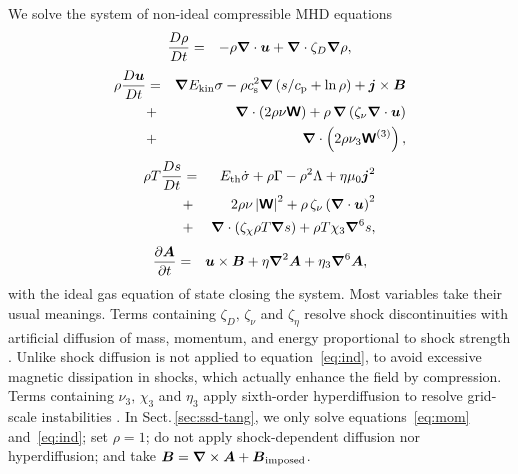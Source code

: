 \documentclass[preprint2]{aastex63}
\newcommand\ESK{E_{\rm kin}}
\newcommand\EST{E_{\rm th}}
\newcommand{\vect}[1]{{{\mbox{\boldmath $#1$}}}}%
\newcommand{\mathbfss}[1]{\textbf{\textsf{#1}}}
\begin{document}
We solve the system of non-ideal compressible MHD equations
  \begin{eqnarray}
  \label{eq:mass}
    \frac{D\rho}{Dt} &=& 
    -\rho \vect\nabla \cdot \vect{u}
    +\vect\nabla \cdot\zeta_D\vect\nabla\rho,
  \end{eqnarray}
  \begin{eqnarray}
  \label{eq:mom}
    \rho\frac{D\vect{u}}{Dt} &=& 
    \vect\nabla{\ESK\sigma}
    -\rho c_{\rm s}^2\vect\nabla\left({s}/{c_{\rm p}}+\ln\rho\right)
    +\vect{j}\times\vect{B}
    \nonumber\\
    &+&\vect\nabla\cdot \left(2\rho\nu{\mathbfss W}\right)
    +\rho\,\vect\nabla\left(\zeta_{\nu}\vect\nabla \cdot \vect{u} \right)
    \nonumber\\
    &+&\vect\nabla\cdot \left(2\rho\nu_3{\mathbfss W}^{(3)}\right),
  \end{eqnarray}
  \begin{eqnarray}
  \label{eq:ent}
    \rho T\frac{D s}{Dt} &=&
     \EST\dot\sigma +\rho\Gamma
    -\rho^2\Lambda +\eta\mu_0\vect{j}^2 
    \nonumber\\
    &+&2 \rho \nu\left|{\mathbfss W}\right|^{2}
    +\rho\,\zeta_{\nu}\left(\vect\nabla \cdot \vect{u} \right)^2
    \nonumber\\
    &+&\vect\nabla\cdot\left(\zeta_\chi\rho T\vect\nabla s\right)
    +\rho T\chi_3\vect\nabla^6 s,
  \end{eqnarray}
  \begin{eqnarray}
  \label{eq:ind}
    \frac{\partial \vect{A}}{\partial t} &=&
    \vect{u}\times\vect{B}
    +\eta\vect\nabla^2\vect{A}
    +\eta_3\vect\nabla^6\vect{A},
  \end{eqnarray}
 with the ideal gas equation of state closing the system.
 Most variables take their usual meanings.
 Terms containing $\zeta_D,\,\zeta_\nu$ and $\zeta_\eta$ resolve shock
 discontinuities with artificial diffusion of mass, momentum, and energy
 proportional to shock strength \citep[see][for details]{GMKSH20}.
 Unlike \citet{Gent:2013b} shock diffusion is not applied to
 equation~\eqref{eq:ind}, to avoid excessive magnetic dissipation in
 shocks, which actually enhance the field by compression.
 Terms containing $\nu_3,\,\chi_3$ and $\eta_3$ apply sixth-order hyperdiffusion
 to resolve grid-scale instabilities \citep[see, e.g.,][]{ABGS02,HB04}.
 In Sect.\,\ref{sec:ssd-tang}, we only solve equations~\eqref{eq:mom}
 and~\eqref{eq:ind}; set $\rho=1$; do not apply shock-dependent diffusion nor
 hyperdiffusion; and take $\vect{B}=\vect\nabla\times\vect{A}+
 \vect{B}_{\rm imposed}$.
\end{document}

